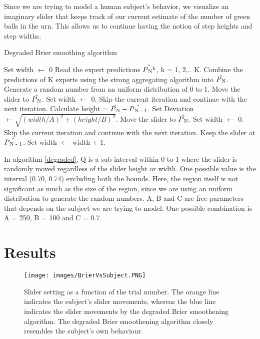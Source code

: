 \documentclass{article}
\begin{document}
Since we are trying to model a human subject's behavior, we visualize an imaginary slider that keeps track of our current estimate of the number of green balls in the urn. This allows us to continue having the notion of step heights and step widths.

\begin{algorithm}
\caption{Degraded Brier smoothing algorithm}\label{degraded}
\begin{algorithmic}
\State Set width $\leftarrow$ 0
	\State Read the expert predictions $\hat{P\textsubscript{N}\textsuperscript{k}}$, k = 1, 2,.. K.
	\State Combine the predictions of K experts using the strong aggregating algorithm into $\hat{P\textsubscript{N}}$.
	\State Generate a random number from an uniform distribution of 0 to 1.
		\State Move the slider to $\hat{P\textsubscript{N}}$.
		\State Set width $\leftarrow$ 0.
		\State Skip the current iteration and continue with the next iteration.
	\EndIf
	\State Calculate height = $\hat{P\textsubscript{N}} - \hat{P\textsubscript{N - 1}}$.
	\State Set Deviation $\leftarrow \sqrt{(width/A) ^ 2 + (height/B) ^ 2}$.
		\State Move the slider to $\hat{P\textsubscript{N}}$.
		\State Set width $\leftarrow$ 0.
		\State Skip the current iteration and continue with the next iteration.
	\EndIf
	\State Keep the slider at $\hat{P\textsubscript{N - 1}}$.
	\State Set width $\leftarrow$ width + 1.
\EndFor
\end{algorithmic}
\end{algorithm}

In algorithm \ref{degraded}, Q is a sub-interval within 0 to 1 where the slider is randomly moved regardless of the slider height or width. One possible value is the interval (0.70, 0.74) excluding both the bounds. Here, the region itself is not significant as much as the size of the region, since we are using an uniform distribution to generate the random numbers. A, B and C are free-parameters that depends on the subject we are trying to model. One possible combination is A = 250, B = 100 and C = 0.7.

\section{Results}

\begin{figure}
	\texttt{[image: images/BrierVsSubject.PNG]}
	\caption{Slider setting as a function of the trial number. The orange line indicates the subject's slider movements, whereas the blue line indicates the slider movements by the degraded Brier smoothening algorithm. The degraded Brier smoothening algorithm closely resembles the subject's own behaviour.}
	\label{fig:BrierVsSubject}
\end{figure}
\end{document}
